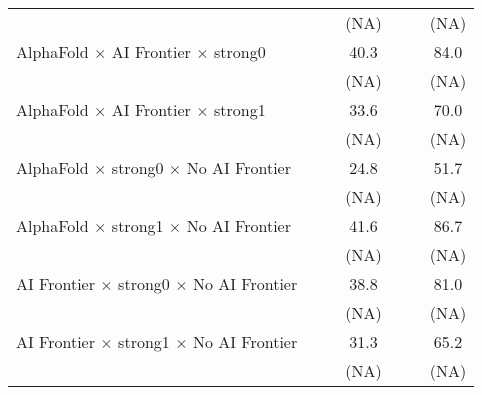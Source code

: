 \begin{tabular}{lcccccc}
                                                                              &                        &        & (NA)   &                        &        & (NA)\\   
   AlphaFold $\times$ AI Frontier $\times$ strong0                            &                        &        & 40.3   &                        &        & 84.0\\   
                                                                              &                        &        & (NA)   &                        &        & (NA)\\   
   AlphaFold $\times$ AI Frontier $\times$ strong1                            &                        &        & 33.6   &                        &        & 70.0\\   
                                                                              &                        &        & (NA)   &                        &        & (NA)\\   
   AlphaFold $\times$ strong0 $\times$ No AI Frontier                         &                        &        & 24.8   &                        &        & 51.7\\   
                                                                              &                        &        & (NA)   &                        &        & (NA)\\   
   AlphaFold $\times$ strong1 $\times$ No AI Frontier                         &                        &        & 41.6   &                        &        & 86.7\\   
                                                                              &                        &        & (NA)   &                        &        & (NA)\\   
   AI Frontier $\times$ strong0 $\times$ No AI Frontier                       &                        &        & 38.8   &                        &        & 81.0\\   
                                                                              &                        &        & (NA)   &                        &        & (NA)\\   
   AI Frontier $\times$ strong1 $\times$ No AI Frontier                       &                        &        & 31.3   &                        &        & 65.2\\   
                                                                              &                        &        & (NA)   &                        &        & (NA)\\   

\end{tabular}
